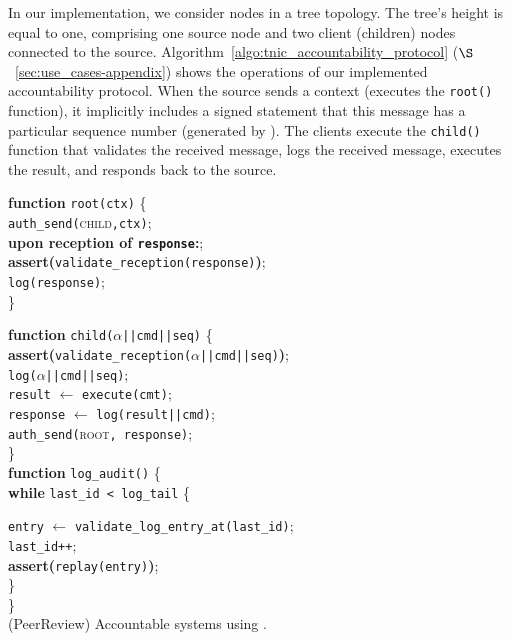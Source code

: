 In our implementation, we consider nodes in a tree topology. The tree's height is equal to one, comprising one source node and two client (children) nodes connected to the source. Algorithm~\ref{algo:tnic_accountability_protocol} ($\S$~\ref{sec:use_cases-appendix}) shows the operations of our implemented accountability protocol. When the source sends a context (executes the \texttt{root()} function), it implicitly includes a signed statement that this message has a particular sequence number (generated by \projecttitle{}). The clients execute the {\tt child()} function that validates the received message, logs the received message, executes the result, and responds back to the source. 


\begin{algorithm}[t]
\SetAlgoLined
\small
\textbf{function} \texttt{root(ctx)} \{ \\
\Indp
 \texttt{auth\_send(}\textsc{child}{\tt,ctx)};\\
 {\bf upon reception of \texttt{response}:};\\
 \Indp
    {\bf assert(}\texttt{validate\_reception(response)}{\bf)};\\
    \texttt{log(response)};\\
\Indm
\Indm
\} \\

\vspace{0.15cm}

\textbf{function} \texttt{child($\alpha$||cmd||seq)} \{ \\
\Indp
    {\bf assert(}\texttt{validate\_reception($\alpha$||cmd||seq)}{\bf)};\\
    \texttt{log($\alpha$||cmd||seq)};\\
    {\tt result} $\leftarrow$ \texttt{execute(cmt)};\\
    {\tt response} $\leftarrow$ \texttt{log(result||cmd)};\\
    \texttt{auth\_send(}\textsc{root}{\tt, response)};\\
\Indm
\} \\
\vspace{0.15cm}
\textbf{function} \texttt{log\_audit()} \{ \\
\Indp
    {\bf{while}} \texttt{last\_id < log\_tail} \{\\
    \Indp

        \texttt{entry} $\leftarrow$ \texttt{validate\_log\_entry\_at(last\_id)};\\
        \texttt{last\_id++};\\
        {\bf assert(}\texttt{replay(entry)}{\bf{)}};\\
    \Indm
    \}\\
\Indm
\} \\
\caption{ (PeerReview) Accountable systems using \projecttitle{}.}
\label{algo:tnic_accountability_protocol}
\end{algorithm}


